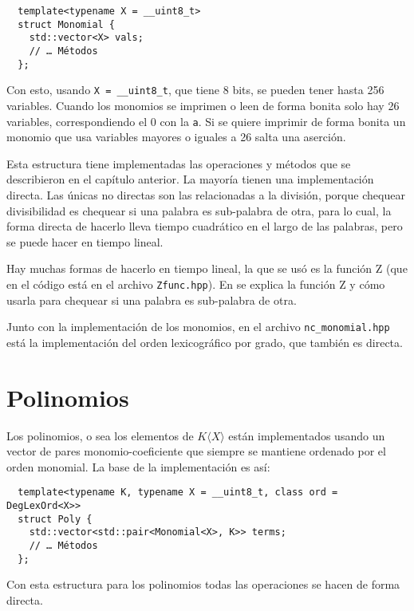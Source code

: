 \documentclass[12pt]{report}
\theoremstyle{customstyle}
\theoremstyle{factstyle}
\begin{document}
\begin{verbatim}
  template<typename X = __uint8_t>
  struct Monomial {
    std::vector<X> vals;
    // … Métodos
  };
\end{verbatim}

Con esto, usando \texttt{X = \_\_uint8\_t}, que tiene 8 bits, se pueden tener hasta 256 variables. Cuando los monomios se imprimen o leen de forma bonita solo hay 26 variables, correspondiendo el 0 con la \texttt{a}. Si se quiere imprimir de forma bonita un monomio que usa variables mayores o iguales a 26 salta una aserción.

Esta estructura tiene implementadas las operaciones y métodos que se describieron en el capítulo anterior. La mayoría tienen una implementación directa. Las únicas no directas son las relacionadas a la división, porque chequear divisibilidad es chequear si una palabra es sub-palabra de otra, para lo cual, la forma directa de hacerlo lleva tiempo cuadrático en el largo de las palabras, pero se puede hacer en tiempo lineal.

Hay muchas formas de hacerlo en tiempo lineal, la que se usó es la función Z (que en el código está en el archivo \texttt{Zfunc.hpp}). En \cite{web:cp-algo:Zfunc} se explica la función Z y cómo usarla para chequear si una palabra es sub-palabra de otra.

Junto con la implementación de los monomios, en el archivo \texttt{nc\_monomial.hpp} está la implementación del orden lexicográfico por grado, que también es directa.

\section{Polinomios}

Los polinomios, o sea los elementos de $K⟨X⟩$ están implementados usando un vector de pares monomio-coeficiente que siempre se mantiene ordenado por el orden monomial. La base de la implementación es así:

\begin{verbatim}
  template<typename K, typename X = __uint8_t, class ord = DegLexOrd<X>>
  struct Poly {
    std::vector<std::pair<Monomial<X>, K>> terms;
    // … Métodos
  };
\end{verbatim}

Con esta estructura para los polinomios todas las operaciones se hacen de forma directa.
\end{document}
